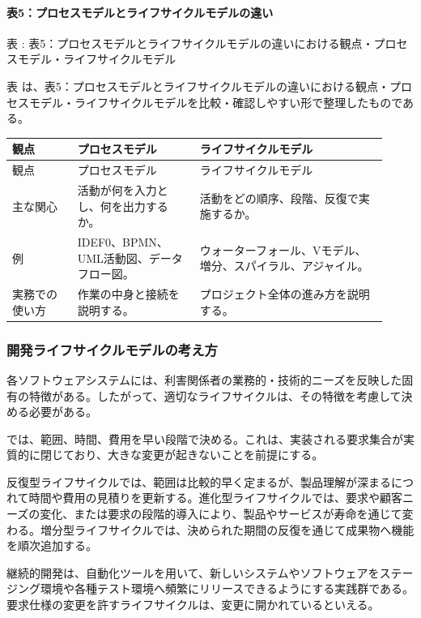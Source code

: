 \paragraph{表5：プロセスモデルとライフサイクルモデルの違い}
\par\smallskip\noindent{}\label{tab:ch10-05}表 \thetable: 表5：プロセスモデルとライフサイクルモデルの違いにおける観点・プロセスモデル・ライフサイクルモデル\par\smallskip
表 \thetable は、表5：プロセスモデルとライフサイクルモデルの違いにおける観点・プロセスモデル・ライフサイクルモデルを比較・確認しやすい形で整理したものである。\par\smallskip
\begin{longtable}{>{\raggedright\arraybackslash}p{0.16\linewidth}>{\raggedright\arraybackslash}p{0.30\linewidth}>{\raggedright\arraybackslash}p{0.46\linewidth}}
\toprule
観点 & プロセスモデル & ライフサイクルモデル\\
\midrule
\endfirsthead
\toprule
観点 & プロセスモデル & ライフサイクルモデル\\
\midrule
\endhead
主な関心 & 活動が何を入力とし、何を出力するか。 & 活動をどの順序、段階、反復で実施するか。\\
例 & IDEF0、BPMN、UML活動図、データフロー図。 & ウォーターフォール、Vモデル、増分、スパイラル、アジャイル。\\
実務での使い方 & 作業の中身と接続を説明する。 & プロジェクト全体の進み方を説明する。\\
\bottomrule
\end{longtable}
\subsubsection{開発ライフサイクルモデルの考え方}
各ソフトウェアシステムには、利害関係者の業務的・技術的ニーズを反映した固有の特徴がある。したがって、適切なライフサイクルは、その特徴を考慮して決める必要がある。

では、範囲、時間、費用を早い段階で決める。これは、実装される要求集合が実質的に閉じており、大きな変更が起きないことを前提にする。

反復型ライフサイクルでは、範囲は比較的早く定まるが、製品理解が深まるにつれて時間や費用の見積りを更新する。進化型ライフサイクルでは、要求や顧客ニーズの変化、または要求の段階的導入により、製品やサービスが寿命を通じて変わる。増分型ライフサイクルでは、決められた期間の反復を通じて成果物へ機能を順次追加する。

継続的開発は、自動化ツールを用いて、新しいシステムやソフトウェアをステージング環境や各種テスト環境へ頻繁にリリースできるようにする実践群である。要求仕様の変更を許すライフサイクルは、変更に開かれているといえる。

